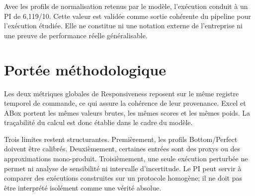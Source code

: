 Avec les profils de normalisation retenus par le modèle, l'exécution conduit à un PI de 6,119/10. Cette valeur est validée comme sortie cohérente du pipeline pour l'exécution étudiée. Elle ne constitue ni une notation externe de l'entreprise ni une preuve de performance réelle généralisable.

\section{Portée méthodologique}

Les deux métriques globales de Responsiveness reposent sur le même registre temporel de commande, ce qui assure la cohérence de leur provenance. Excel et ABox portent les mêmes valeurs brutes, les mêmes scores et les mêmes poids. La traçabilité du calcul est donc établie dans le cadre du modèle.

Trois limites restent structurantes. Premièrement, les profils Bottom/Perfect doivent être calibrés. Deuxièmement, certaines entrées sont des proxys ou des approximations mono-produit. Troisièmement, une seule exécution perturbée ne permet ni analyse de sensibilité ni intervalle d'incertitude. Le PI peut servir à comparer des exécutions construites sur un protocole homogène; il ne doit pas être interprété isolément comme une vérité absolue.
